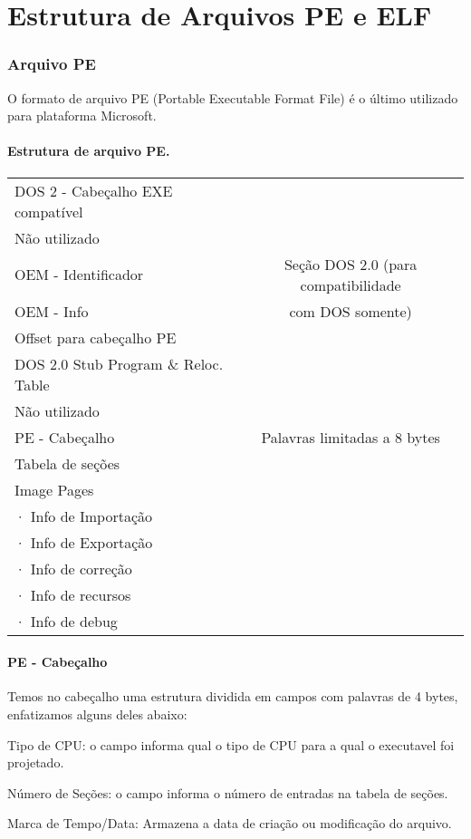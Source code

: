 \part{Estrutura de Arquivos PE e ELF}


\section{Arquivo PE}

O formato de arquivo PE (Portable Executable Format File) é o último
utilizado para plataforma Microsoft.


\subsection{Estrutura de arquivo PE.}
\begin{list}{}
\item {\begin{tabular}{|l|c|}
\hline 
DOS 2 - Cabeçalho EXE compatível  & \tabularnewline
\cline{1-1} 
Não utilizado  & \tabularnewline
\cline{1-1} 
OEM - Identificador  & Seção DOS 2.0 (para compatibilidade \tabularnewline
OEM - Info  & com DOS somente)\tabularnewline
Offset para cabeçalho PE & \tabularnewline
\cline{1-1} 
DOS 2.0 Stub Program \& Reloc. Table  & \tabularnewline
\hline 
Não utilizado & \tabularnewline
\hline 
PE - Cabeçalho & Palavras limitadas a 8 bytes\tabularnewline
\hline 
Tabela de seções & \tabularnewline
\hline
Image Pages  & \tabularnewline
· Info de Importação & \tabularnewline
· Info de Exportação  & \tabularnewline
· Info de correção & \tabularnewline
· Info de recursos & \tabularnewline
· Info de debug & \tabularnewline
\hline
\end{tabular}}
\end{list}

\subsection{PE - Cabeçalho}


Temos no cabeçalho uma estrutura dividida em campos com palavras
de 4 bytes, enfatizamos alguns deles abaixo:


Tipo de CPU: o campo informa qual o tipo de CPU para a qual o executavel
foi projetado.


Número de Seções: o campo informa o número de entradas na tabela
de seções.


Marca de Tempo/Data: Armazena a data de criação ou modificação do
arquivo.


